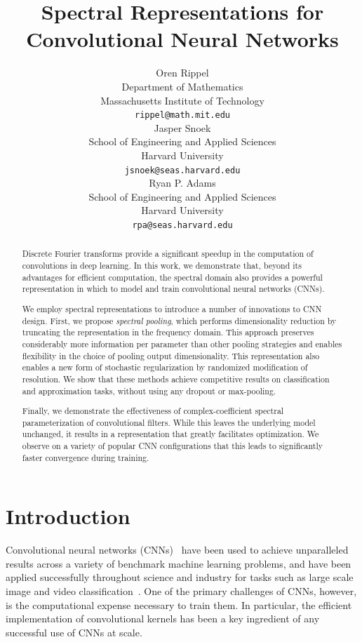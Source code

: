 \documentclass{article} %
\title{Spectral Representations for \\Convolutional Neural Networks}
\author{
Oren Rippel \\
Department of Mathematics\\
Massachusetts Institute of Technology\\
\texttt{rippel@math.mit.edu} \\
\And
Jasper Snoek \\
School of Engineering and Applied Sciences \\
Harvard University \\
\texttt{jsnoek@seas.harvard.edu} \\
\AND
Ryan P. Adams \\
School of Engineering and Applied Sciences \\
Harvard University \\
\texttt{rpa@seas.harvard.edu} \\
}
\begin{document}
\maketitle
\begin{abstract}
Discrete Fourier transforms provide a significant speedup in the computation of convolutions in deep learning. In this work, we demonstrate that, beyond its advantages for efficient computation, the spectral domain also provides a powerful representation in which to model and train convolutional neural networks (CNNs).

We employ spectral representations to introduce a number of innovations to CNN design. First, we propose \emph{spectral pooling}, which performs dimensionality reduction by truncating the representation in the frequency domain. This approach preserves considerably more information per parameter than other pooling strategies and enables flexibility in the choice of pooling output dimensionality.  This representation also enables a new form of stochastic regularization by randomized modification of resolution.  We show that these methods achieve competitive results on classification and approximation tasks, without using any dropout or max-pooling.  

Finally, we demonstrate the effectiveness of complex-coefficient spectral parameterization of convolutional filters. While this leaves the underlying model unchanged, it results in a representation that greatly facilitates optimization. We observe on a variety of popular CNN configurations that this leads to significantly faster convergence during training.
\end{abstract}
\section{Introduction}
Convolutional neural networks (CNNs)~\citep{lecun-et-al-1990a} have been used to achieve unparalleled results across a variety of benchmark machine learning problems, and have been applied successfully throughout science and industry for tasks such as large scale image and video classification~\citep{krizhevsky-et-al-2012,karpathy-etal-2014}.  One of the primary challenges of CNNs, however, is the computational expense necessary to train them.  In particular, the efficient implementation of convolutional kernels has been a key ingredient of any successful use of CNNs at scale.
\end{document}
